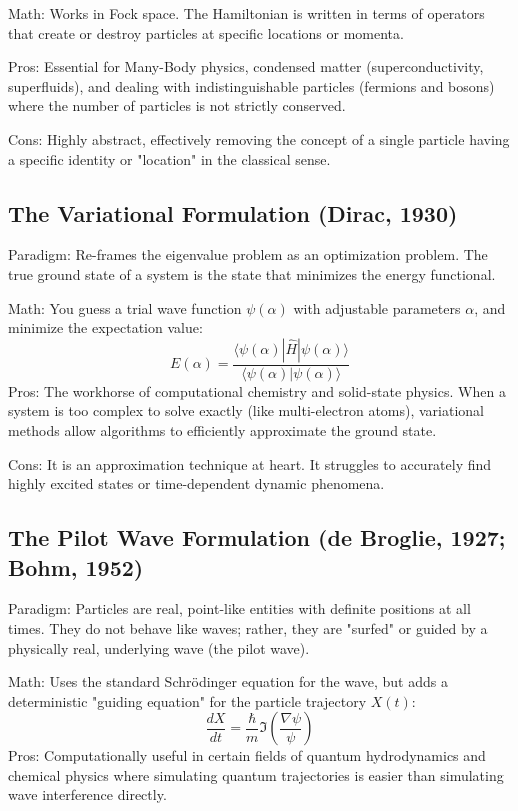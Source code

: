 Math: Works in Fock space. The Hamiltonian is written in terms of operators 
that create or destroy particles at specific locations or momenta.

Pros: Essential for Many-Body physics, condensed matter (superconductivity,
superfluids), and dealing with indistinguishable particles (fermions and bosons)
where the number of particles is not strictly conserved.

Cons: Highly abstract, effectively removing the concept of a single particle
having a specific identity or "location" in the classical sense.

\subsection{The Variational Formulation (Dirac, 1930)}
Paradigm: Re-frames the eigenvalue problem as an optimization problem. 
The true ground state of a system is the state that minimizes the energy
functional.

Math: You guess a trial wave function $\psi(\alpha)$ with adjustable 
parameters $\alpha$, and minimize the expectation value:
$$E(\alpha) = \frac{\langle \psi(\alpha) | \hat{H} | \psi(\alpha) 
\rangle}{\langle \psi(\alpha) | \psi(\alpha) \rangle}$$
Pros: The workhorse of computational chemistry and solid-state physics. 
When a system is too complex to solve exactly (like multi-electron atoms),
variational methods allow algorithms to efficiently approximate 
the ground state.

Cons: It is an approximation technique at heart. It struggles to accurately
find highly excited states or time-dependent dynamic phenomena.

\subsection{ The Pilot Wave Formulation (de Broglie, 1927; Bohm, 1952)}
Paradigm: Particles are real, point-like entities with definite positions at 
all times. They do not behave like waves; rather, they are "surfed" or guided
by a physically real, underlying wave (the pilot wave).

Math: Uses the standard Schrödinger equation for the wave, but adds a 
deterministic "guiding equation" for the particle trajectory $X(t)$:
$$\frac{dX}{dt} = \frac{\hbar}{m} \Im \left( \frac{\nabla \psi}{\psi} \right)$$
Pros: Computationally useful in certain fields of quantum hydrodynamics and 
chemical physics where simulating quantum trajectories is easier than 
simulating wave interference directly.

